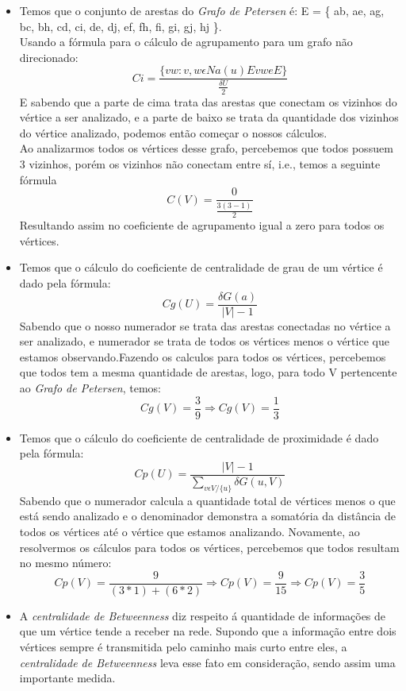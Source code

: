 \documentclass[11pt,reqno]{amsart}
\begin{document}
\begin{enumerate}
		\begin{itemize}
			\item Temos que o conjunto de arestas do \textit{Grafo de Petersen} é: E = \{ ab, ae, ag, bc, bh, cd, ci, de, dj, 
			ef, fh, fi, gi, gj, hj \}. \\ Usando a fórmula para o cálculo de agrupamento para um grafo não direcionado: \[ C\textit{i} = \frac{\{vw: v,w\epsilon  Na(u) E vw\textit{e} E\}}{\frac{\delta U}{2}}\] E sabendo que a parte de cima 
			trata das arestas que conectam os vizinhos do vértice a ser analizado, e a parte de baixo se trata da quantidade 
			dos vizinhos do vértice analizado, podemos então começar o nossos cálculos.\\ Ao analizarmos todos os vértices 
			desse grafo, percebemos que todos possuem 3 vizinhos, porém os vizinhos não conectam entre sí, i.e., temos a 
			seguinte fórmula \[C(V) = \frac{0}{\frac{3(3-1)}{2}}\] Resultando assim no coeficiente de agrupamento igual a zero 
			para todos os vértices.
			\vspace{5.0cm}
			\item Temos que o cálculo do coeficiente de centralidade de grau de um vértice é dado pela fórmula: \[C\textit{g}(U) = \frac{\delta G(a)}{|V|-1}\]
			 Sabendo que o nosso numerador se trata das arestas conectadas no vértice a ser analizado, e numerador se trata de 
			 todos os vértices menos o vértice que estamos observando.Fazendo os calculos para todos os vértices, percebemos 
			 que todos tem a mesma quantidade de arestas, logo, para todo V pertencente ao \textit{Grafo de Petersen}, temos:
			  \[C\textit{g}(V) = \frac{3}{9} \Rightarrow C\textit{g}(V) = \frac{1}{3}\] 
			\item Temos que o cálculo do coeficiente de centralidade de proximidade é dado pela fórmula: \[C\textit{p}(U) = \frac{|V|-1}{\sum\limits_{v \epsilon V /\{u\}}\delta G(u,V)}\] 
			Sabendo que o numerador calcula a quantidade total de vértices menos o que está sendo analizado e o denominador 
			demonstra a somatória da distância de todos os vértices até o vértice que estamos analizando. Novamente, ao 
			resolvermos os cálculos para todos os vértices, percebemos que todos resultam no mesmo número: \[C\textit{p}(V) = \frac{9}{(3*1)+(6*2)} \Rightarrow C\textit{p}(V) = \frac{9}{15} \Rightarrow C\textit{p}(V) = \frac{3}{5}\] 
			\item A \textit{centralidade de Betweenness} diz respeito á quantidade de informações de que um vértice tende a 
			receber na rede. Supondo que a informação entre dois vértices sempre é transmitida pelo caminho mais curto entre 
			eles, a \textit{centralidade de Betweenness} leva esse fato em consideração, sendo assim uma importante medida.
		\end{itemize}
		\vspace{0.4cm}


\end{enumerate}
\end{document}
